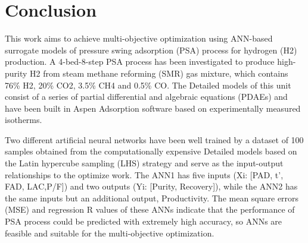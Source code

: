 \documentclass[preprint,12pt]{elsarticle}
\begin{document}
\section{Conclusion}
This work aims to achieve multi-objective optimization using ANN-based surrogate models of pressure swing adsorption (PSA) process for hydrogen (H2)  production. A 4-bed-8-step PSA process has been investigated to produce high-purity H2 from steam methane reforming (SMR) gas mixture, which contains 76\% H2, 20\% CO2, 3.5\% CH4 and 0.5\% CO. The Detailed models of this unit consist of a series of partial differential and algebraic equations (PDAEs) and have been built in Aspen Adsorption software based on experimentally measured isotherms. 

Two different artificial neural networks have been well trained by a dataset of 100 samples obtained from the computationally expensive Detailed models based on the Latin hypercube sampling (LHS) strategy and serve as the input-output relationships to the optimize work. The ANN1 has five inputs (Xi: [PAD, t’, FAD, LAC,P/F]) and two outputs (Yi: [Purity, Recovery]), while the ANN2 has the same inputs but an additional output, Productivity. The mean square errors (MSE) and regression R values of these ANNs indicate that the performance of PSA process could be predicted with extremely high accuracy, so ANNs are feasible and suitable for the multi-objective optimization. 
\end{document}

